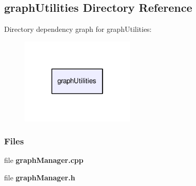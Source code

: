 \subsection{graph\-Utilities Directory Reference}
\label{dir_b5e0a4c2abe2f4cb1bbfa97b52316a11}
Directory dependency graph for graph\-Utilities\-:\nopagebreak
\begin{figure}[H]
\begin{center}
\leavevmode
\includegraphics[width=154pt]{dir_b5e0a4c2abe2f4cb1bbfa97b52316a11_dep}
\end{center}
\end{figure}
\subsubsection*{Files}
\begin{DoxyCompactItemize}
\item 
file {\bf graph\-Manager.\-cpp}
\item 
file {\bf graph\-Manager.\-h}
\end{DoxyCompactItemize}
